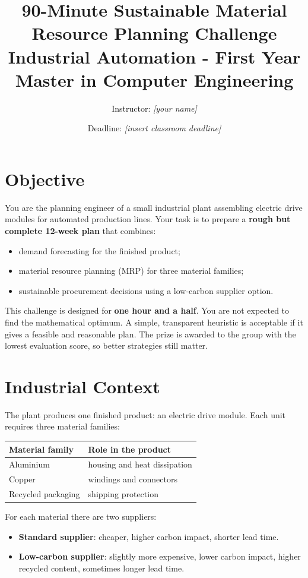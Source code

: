 \documentclass[11pt,a4paper]{article}
\title{90-Minute Sustainable Material Resource Planning Challenge\\
\large Industrial Automation - First Year Master in Computer Engineering}
\author{Instructor: \textit{[your name]}}
\date{Deadline: \textit{[insert classroom deadline]}}
\begin{document}
\maketitle

\section*{Objective}
You are the planning engineer of a small industrial plant assembling electric drive modules for automated production lines. Your task is to prepare a \textbf{rough but complete 12-week plan} that combines:
\begin{itemize}
    \item demand forecasting for the finished product;
    \item material resource planning (MRP) for three material families;
    \item sustainable procurement decisions using a low-carbon supplier option.
\end{itemize}

This challenge is designed for \textbf{one hour and a half}. You are not expected to find the mathematical optimum. A simple, transparent heuristic is acceptable if it gives a feasible and reasonable plan. The prize is awarded to the group with the lowest evaluation score, so better strategies still matter.

\section*{Industrial Context}
The plant produces one finished product: an electric drive module. Each unit requires three material families:
\begin{center}
\begin{tabular}{ll}
\toprule
Material family & Role in the product \\
\midrule
Aluminium & housing and heat dissipation \\
Copper & windings and connectors \\
Recycled packaging & shipping protection \\
\bottomrule
\end{tabular}
\end{center}

For each material there are two suppliers:
\begin{itemize}
    \item \textbf{Standard supplier}: cheaper, higher carbon impact, shorter lead time.
    \item \textbf{Low-carbon supplier}: slightly more expensive, lower carbon impact, higher recycled content, sometimes longer lead time.
\end{itemize}
\end{document}
